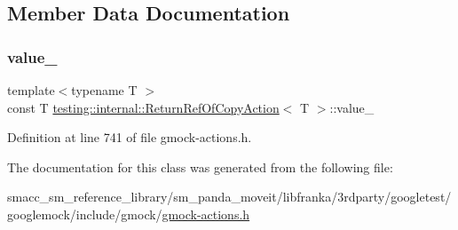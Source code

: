 \subsection{Member Data Documentation}
\mbox{\label{classtesting_1_1internal_1_1ReturnRefOfCopyAction_a41fdd44b2021e01db916c6d5afcbf73f}} 
\subsubsection{\texorpdfstring{value\+\_\+}{value\_}}
{\footnotesize\ttfamily template$<$typename T $>$ \\
const T \hyperlink{classtesting_1_1internal_1_1ReturnRefOfCopyAction}{testing\+::internal\+::\+Return\+Ref\+Of\+Copy\+Action}$<$ T $>$\+::value\+\_\+\hspace{0.3cm}{\ttfamily [private]}}



Definition at line 741 of file gmock-\/actions.\+h.



The documentation for this class was generated from the following file\+:\begin{DoxyCompactItemize}
\item 
smacc\+\_\+sm\+\_\+reference\+\_\+library/sm\+\_\+panda\+\_\+moveit/libfranka/3rdparty/googletest/googlemock/include/gmock/\hyperlink{gmock-actions_8h}{gmock-\/actions.\+h}\end{DoxyCompactItemize}
